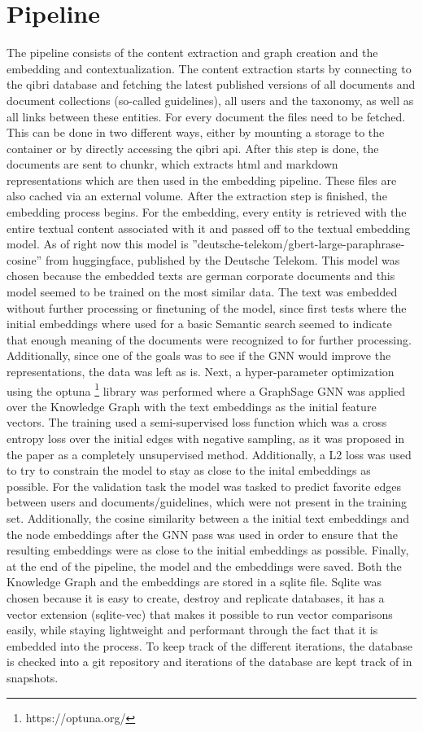 \documentclass[draft,final]{vutinfth} %
\begin{document}
\section{Pipeline}
The pipeline consists of the content extraction and graph creation and the embedding and contextualization. The content extraction starts by connecting to the qibri database and fetching the latest published versions of all documents and document collections (so-called guidelines), all users and the taxonomy, as well as all links between these entities. For every document the files need to be fetched. This can be done in two different ways, either by mounting a storage to the container or by directly accessing the qibri api. After this step is done, the documents are sent to chunkr, which extracts html and markdown representations which are then used in the embedding pipeline. These files are also cached via an external volume. After the extraction step is finished, the embedding process begins. For the embedding, every entity is retrieved with the entire textual content associated with it and passed off to the textual embedding model. As of right now this model is ''deutsche-telekom/gbert-large-paraphrase-cosine'' from huggingface, published by the Deutsche Telekom.\cite{german_bert} This model was chosen because the embedded texts are german corporate documents and this model seemed to be trained on the most similar data. The text was embedded without further processing or finetuning of the model,  since first tests where the initial embeddings where used for a basic Semantic search seemed to indicate that enough meaning of the documents were recognized to for further processing. Additionally, since one of the goals was to see if the GNN would improve the representations, the data was left as is. Next, a hyper-parameter optimization using the optuna \footnote{https://optuna.org/} library was performed where a GraphSage GNN was applied over the Knowledge Graph with the text embeddings as the initial feature vectors. The training used a semi-supervised loss function which was a cross entropy loss  over the initial edges with negative sampling, as it was proposed in the paper as a completely unsupervised method. Additionally, a L2 loss was used to try to constrain the model to stay as close to the inital embeddings as possible. For the validation task the model was tasked to predict favorite edges between users and documents/guidelines, which were not present in the training set. Additionally, the cosine similarity between a the initial text embeddings and the node embeddings after the GNN pass was used in order to ensure that the resulting embeddings were as close to the initial embeddings as possible. Finally, at the end of the pipeline, the model and the embeddings were saved. Both the Knowledge Graph and the embeddings are stored in a sqlite file. Sqlite was chosen because it is easy to create, destroy and replicate databases, it has a vector extension (sqlite-vec) that makes it possible to run vector comparisons easily, while staying lightweight and performant through the fact that it is embedded into the process. To keep track of the different iterations, the database is checked into a git repository and iterations of the database are kept track of in snapshots.
\end{document}
